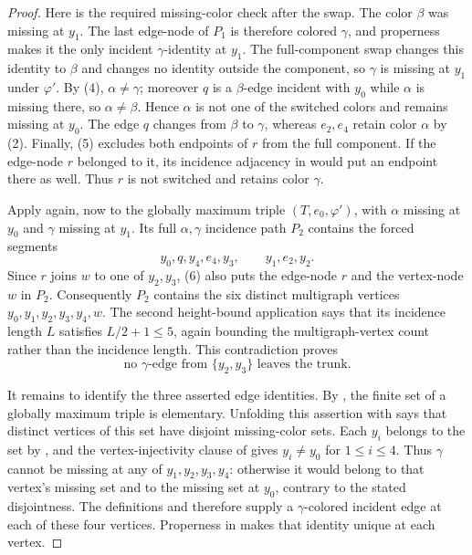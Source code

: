 \begin{proof}
Here is the required missing-color check after the swap.  The color
$\beta$ was missing at $y_1$.  The last edge-node of $P_1$ is therefore
colored $\gamma$, and properness makes it the only incident
$\gamma$-identity at $y_1$.  The full-component swap changes this identity
to $\beta$ and changes no identity outside the component, so $\gamma$ is
missing at $y_1$ under $\varphi'$.  By (4), $\alpha\ne\gamma$; moreover
$q$ is a $\beta$-edge incident with $y_0$ while $\alpha$ is missing there,
so $\alpha\ne\beta$.  Hence $\alpha$ is not one of the switched colors and
remains missing at $y_0$.  The edge $q$ changes from $\beta$ to $\gamma$,
whereas $e_2,e_4$ retain color $\alpha$ by (2).  Finally, (5) excludes both
endpoints of $r$ from the full component.  If the edge-node $r$ belonged to
it, its incidence adjacency in  would put
an endpoint there as well.  Thus $r$ is not switched and retains color
$\gamma$.

Apply  again, now to the globally
maximum triple $(T,e_0,\varphi')$, with $\alpha$ missing at $y_0$ and
$\gamma$ missing at $y_1$.  Its full $\alpha,\gamma$ incidence path $P_2$
contains the forced segments
\[
 y_0,q,y_4,e_4,y_3,
 \qquad y_1,e_2,y_2.                                 \tag{6}
\]
Since $r$ joins $w$ to one of $y_2,y_3$, (6) also puts the edge-node $r$
and the vertex-node $w$ in $P_2$.  Consequently $P_2$ contains the six
distinct multigraph vertices $y_0,y_1,y_2,y_3,y_4,w$.  The second
height-bound application says that its incidence length $L$ satisfies
$L/2+1\leq5$, again bounding the multigraph-vertex count rather than the
incidence length.  This contradiction proves
\[
 \text{no $\gamma$-edge from $\{y_2,y_3\}$ leaves the trunk.} \tag{7}
\]

It remains to identify the three asserted edge identities.  By
, the finite set
 of a globally maximum triple is elementary.
Unfolding this assertion with  says
that distinct vertices of this set have disjoint missing-color sets.  Each
$y_i$ belongs to the set by , and the
vertex-injectivity clause of  gives $y_i\ne y_0$ for
$1\leq i\leq4$.  Thus $\gamma$ cannot be missing at any of
$y_1,y_2,y_3,y_4$: otherwise it would belong to that vertex's missing set
and to the missing set at $y_0$, contrary to the stated disjointness.  The
definitions  and  therefore
supply a $\gamma$-colored incident edge at each of these four vertices.
Properness in  makes that identity unique at
each vertex.


\end{proof}
